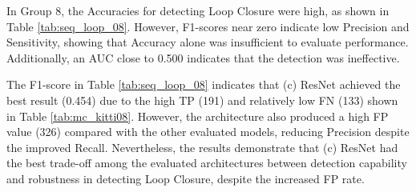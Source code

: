 \documentclass{ieeeaccess}
\begin{document}
In Group 8, the Accuracies for detecting Loop Closure were high, as shown in Table  \ref{tab:seq_loop_08}. However, F1-scores near zero indicate low Precision and Sensitivity, showing that Accuracy alone was insufficient to evaluate performance. Additionally, an AUC close to 0.500 indicates that the detection was ineffective.

The F1-score in Table \ref{tab:seq_loop_08} indicates that (c) ResNet achieved the best result (0.454) due to the high TP (191) and relatively low FN (133) shown in Table \ref{tab:mc_kitti08}. However, the architecture also produced a high FP value (326) compared with the other evaluated models, reducing Precision despite the improved Recall. Nevertheless, the results demonstrate that (c) ResNet had the best trade-off among the evaluated architectures between detection capability and robustness in detecting Loop Closure, despite the increased FP rate. 
\end{document}

